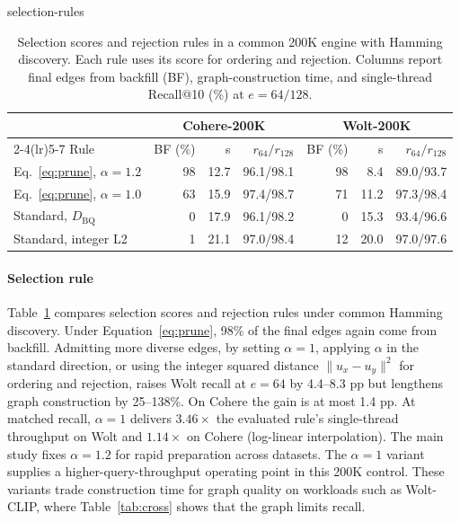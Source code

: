 \begin{table}[t]
\caption{Selection scores and rejection rules in a common 200K engine with Hamming discovery. Each rule uses its score for ordering and rejection. Columns report final edges from backfill (BF), graph-construction time, and single-thread Recall@10 (\%) at $e=64/128$.}
\label{tab:build}
\centering
\footnotesize
\setlength{\tabcolsep}{2.4pt}
\begin{quivercheckedtable}{selection-rules}
\begin{tabular}{lrrrrrr}
\toprule
& \multicolumn{3}{c}{Cohere-200K} & \multicolumn{3}{c}{Wolt-200K}\\
\cmidrule(lr){2-4}\cmidrule(lr){5-7}
Rule & BF (\%) & s & $r_{64}/r_{128}$ & BF (\%) & s & $r_{64}/r_{128}$\\
\midrule
Eq.~\eqref{eq:prune}, $\alpha=1.2$ & 98 & 12.7 & 96.1/98.1 & 98 & 8.4 & 89.0/93.7\\
Eq.~\eqref{eq:prune}, $\alpha=1.0$ & 63 & 15.9 & 97.4/98.7 & 71 & 11.2 & 97.3/98.4\\
Standard, $D_{\mathrm{BQ}}$ & 0 & 17.9 & 96.1/98.2 & 0 & 15.3 & 93.4/96.6\\
Standard, integer L2 & 1 & 21.1 & 97.0/98.4 & 12 & 20.0 & 97.0/97.6\\
\bottomrule
\end{tabular}
\end{quivercheckedtable}
\end{table}

\paragraph{Selection rule}
Table~\ref{tab:build} compares selection scores and rejection rules under common Hamming discovery. Under Equation~\eqref{eq:prune}, 98\% of the final edges again come from backfill. Admitting more diverse edges, by setting $\alpha=1$, applying $\alpha$ in the standard direction, or using the integer squared distance $\|u_x-u_y\|^2$ for ordering and rejection, raises Wolt recall at $e=64$ by 4.4--8.3 pp but lengthens graph construction by 25--138\%. On Cohere the gain is at most 1.4 pp. At matched recall, $\alpha=1$ delivers $3.46\times$ the evaluated rule's single-thread throughput on Wolt and $1.14\times$ on Cohere (log-linear interpolation). The main study fixes $\alpha=1.2$ for rapid preparation across datasets. The $\alpha=1$ variant supplies a higher-query-throughput operating point in this 200K control. These variants trade construction time for graph quality on workloads such as Wolt-CLIP, where Table~\ref{tab:cross} shows that the graph limits recall.

